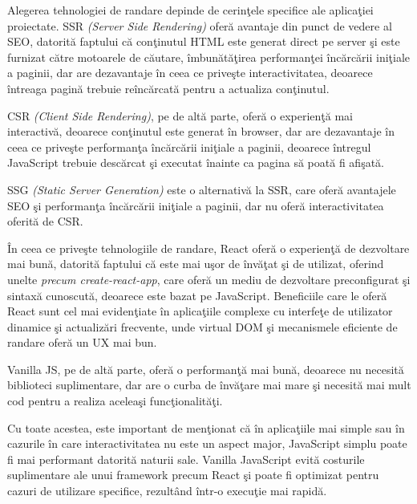 \documentclass[12pt, a4paper]{report}
\begin{document}
Alegerea tehnologiei de randare depinde de cerin\c tele specifice ale aplica\c tiei proiectate. SSR \textit{(Server Side Rendering)} ofer\u a avantaje din punct de vedere al SEO, datorit\u a faptului c\u a con\c tinutul HTML este generat direct pe server \c si este furnizat c\u atre motoarele de c\u autare, \^imbun\u at\u a\c tirea performan\c tei \^inc\u arc\u arii ini\c tiale a paginii, dar are dezavantaje \^in ceea ce prive\c ste interactivitatea, deoarece \^intreaga pagin\u a trebuie re\^inc\u arcat\u a pentru a actualiza con\c tinutul. 

CSR \textit{(Client Side Rendering)}, pe de alt\u a parte, ofer\u a o experien\c t\u a mai interactiv\u a, deoarece con\c tinutul este generat \^in browser, dar are dezavantaje \^in ceea ce prive\c ste performan\c ta \^inc\u arc\u arii ini\c tiale a paginii, deoarece \^intregul JavaScript trebuie desc\u arcat \c si executat \^inainte ca pagina s\u a poat\u a fi afi\c sat\u a.

SSG \textit{(Static Server Generation)} este o alternativ\u a la SSR, care ofer\u a avantajele SEO \c si performan\c ta \^inc\u arc\u arii ini\c tiale a paginii, dar nu ofer\u a interactivitatea oferit\u a de CSR. 

\^In ceea ce prive\c ste tehnologiile de randare, React ofer\u a o experien\c t\u a de dezvoltare mai bun\u a, datorit\u a faptului c\u a este mai u\c sor de \^inv\u a\c tat \c si de utilizat, oferind unelte \textit{precum create-react-app}, care ofer\u a un mediu de dezvoltare preconfigurat \c si sintax\u a cunoscut\u a, deoarece este bazat pe JavaScript. Beneficiile care le ofer\u a React sunt cel mai eviden\c tiate \^in aplica\c tiile complexe cu interfe\c te de utilizator dinamice \c si actualiz\u ari frecvente, unde virtual DOM \c si mecanismele eficiente de randare ofer\u a un UX mai bun.

Vanilla JS, pe de alt\u a parte, ofer\u a o performan\c t\u a mai bun\u a, deoarece nu necesit\u a biblioteci suplimentare, dar are o curba de \^inv\u a\c tare mai mare \c si necesit\u a mai mult cod pentru a realiza acelea\c si func\c tionalit\u a\c ti.

Cu toate acestea, este important de men\c tionat c\u a \^in aplica\c tiile mai simple sau \^in cazurile \^in care interactivitatea nu este un aspect major, JavaScript simplu poate fi mai performant datorit\u a naturii sale. Vanilla JavaScript evit\u a costurile suplimentare ale unui framework precum React \c si poate fi optimizat pentru cazuri de utilizare specifice, rezult\^and \^intr-o  execu\c tie mai rapid\u a.
\end{document}
